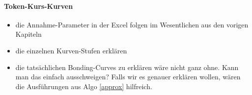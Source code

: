 
\vspace{0.5cm}

\vspace{0.5cm}

\paragraph{Token-Kurs-Kurven}
\textbf{ }
\vspace{0.3cm}


\begin{itemize}
	\item die Annahme-Parameter in der Excel folgen im Wesentlichen aus den vorigen Kapiteln
	\item die einzelnen Kurven-Stufen erklären
	\item die tatsächlichen Bonding-Curves zu erklären wäre nicht ganz ohne. Kann man das einfach ausschweigen? Falls wir es genauer erklären wollen, wären die Ausführungen aus Algo \ref{approx} hilfreich.
\end{itemize}

\vspace{0.5cm}


